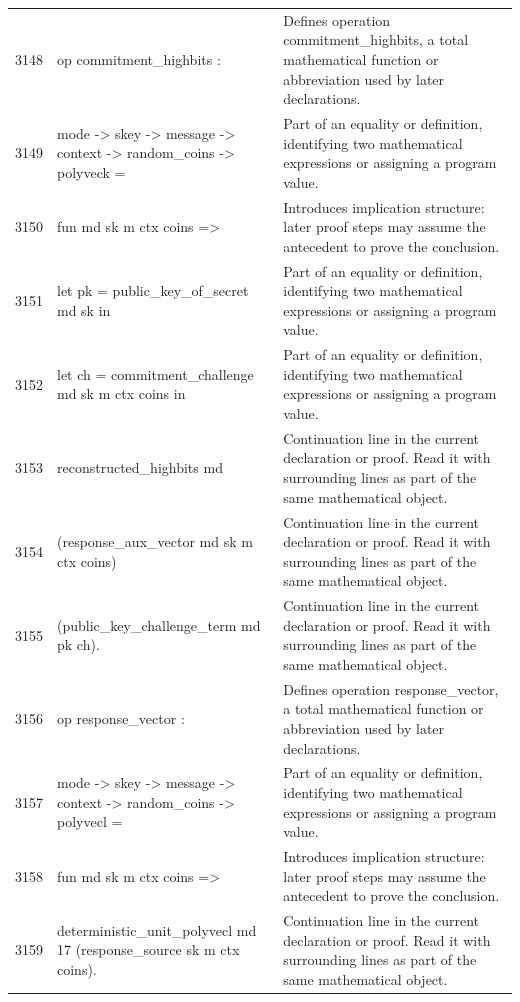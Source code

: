 \documentclass[10pt]{article}
\begin{document}
\begin{longtable}{r L{0.53\textwidth} L{0.37\textwidth}}
3148 & {\ttfamily\scriptsize op commitment\_highbits :} & Defines operation commitment\_highbits, a total mathematical function or abbreviation used by later declarations. \\
3149 & {\ttfamily\scriptsize   mode -> skey -> message -> context -> random\_coins -> polyveck =} & Part of an equality or definition, identifying two mathematical expressions or assigning a program value. \\
3150 & {\ttfamily\scriptsize   fun md sk m ctx coins =>} & Introduces implication structure: later proof steps may assume the antecedent to prove the conclusion. \\
3151 & {\ttfamily\scriptsize     let pk = public\_key\_of\_secret md sk in} & Part of an equality or definition, identifying two mathematical expressions or assigning a program value. \\
3152 & {\ttfamily\scriptsize     let ch = commitment\_challenge md sk m ctx coins in} & Part of an equality or definition, identifying two mathematical expressions or assigning a program value. \\
3153 & {\ttfamily\scriptsize     reconstructed\_highbits md} & Continuation line in the current declaration or proof.  Read it with surrounding lines as part of the same mathematical object. \\
3154 & {\ttfamily\scriptsize       (response\_aux\_vector md sk m ctx coins)} & Continuation line in the current declaration or proof.  Read it with surrounding lines as part of the same mathematical object. \\
3155 & {\ttfamily\scriptsize       (public\_key\_challenge\_term md pk ch).} & Continuation line in the current declaration or proof.  Read it with surrounding lines as part of the same mathematical object. \\
3156 & {\ttfamily\scriptsize op response\_vector :} & Defines operation response\_vector, a total mathematical function or abbreviation used by later declarations. \\
3157 & {\ttfamily\scriptsize   mode -> skey -> message -> context -> random\_coins -> polyvecl =} & Part of an equality or definition, identifying two mathematical expressions or assigning a program value. \\
3158 & {\ttfamily\scriptsize   fun md sk m ctx coins =>} & Introduces implication structure: later proof steps may assume the antecedent to prove the conclusion. \\
3159 & {\ttfamily\scriptsize     deterministic\_unit\_polyvecl md 17 (response\_source sk m ctx coins).} & Continuation line in the current declaration or proof.  Read it with surrounding lines as part of the same mathematical object. \\

\end{longtable}
\end{document}
